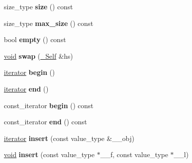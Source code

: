 \begin{DoxyCompactItemize}
\item 
\mbox{\label{classhash__multiset_ad64df13f9aaec55ad9caaf5fdef01311}} 
size\+\_\+type {\bfseries size} () const
\item 
\mbox{\label{classhash__multiset_a484a6d5e3f870899bf88d853021e3a5c}} 
size\+\_\+type {\bfseries max\+\_\+size} () const
\item 
\mbox{\label{classhash__multiset_aa84c756d583da61129c955ad07bfb0d0}} 
bool {\bfseries empty} () const
\item 
\mbox{\label{classhash__multiset_a76f6537abacd9eccf351890a88c7ffaf}} 
\hyperlink{interfacevoid}{void} {\bfseries swap} (\hyperlink{classhash__multiset}{\+\_\+\+Self} \&hs)
\item 
\mbox{\label{classhash__multiset_a3c77b21d07ea687be1725ff7ab4e8488}} 
\hyperlink{structiterator}{iterator} {\bfseries begin} ()
\item 
\mbox{\label{classhash__multiset_aa1b877706a33b82d762b2f5608b8a754}} 
\hyperlink{structiterator}{iterator} {\bfseries end} ()
\item 
\mbox{\label{classhash__multiset_aa1a08e886a433f85d3778c5e445b00a0}} 
const\+\_\+iterator {\bfseries begin} () const
\item 
\mbox{\label{classhash__multiset_afe1563bc94e991ce5dc081439a2065ed}} 
const\+\_\+iterator {\bfseries end} () const
\item 
\mbox{\label{classhash__multiset_afb6275283876b71519ee4a06fe7df27f}} 
\hyperlink{structiterator}{iterator} {\bfseries insert} (const value\+\_\+type \&\+\_\+\+\_\+obj)
\item 
\mbox{\label{classhash__multiset_a8200ba625401e0474dff28da0054285a}} 
\hyperlink{interfacevoid}{void} {\bfseries insert} (const value\+\_\+type $\ast$\+\_\+\+\_\+f, const value\+\_\+type $\ast$\+\_\+\+\_\+l)
\item 
\mbox{\label{classhash__multiset_a8654610ad7cedddc3a50031ff383a99d}} 

\end{DoxyCompactItemize}

